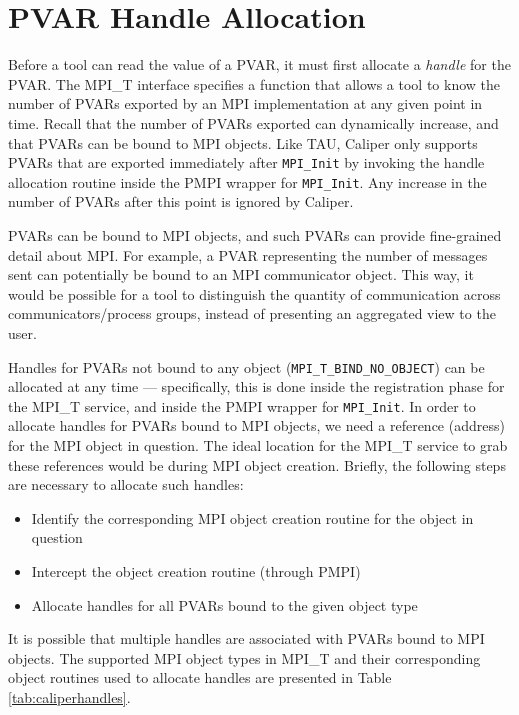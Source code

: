 \section{PVAR Handle Allocation}
Before a tool can read the value of a PVAR, it must first allocate a \emph{handle} for the PVAR. The MPI\_T interface specifies a function that allows a tool to know the number of PVARs exported by an MPI implementation at any given point in time. Recall that the number of PVARs exported can dynamically increase, and that PVARs can be bound to MPI objects. Like TAU, Caliper only supports PVARs that are exported immediately after \verb+MPI_Init+ by invoking the handle allocation routine inside the PMPI wrapper for \verb+MPI_Init+. Any increase in the number of PVARs after this point is ignored by Caliper. 
\par PVARs can be bound to MPI objects, and such PVARs can provide fine-grained detail about MPI. For example, a PVAR representing the number of messages sent can potentially be bound to an MPI communicator object. This way, it would be possible for a tool to distinguish the quantity of communication across communicators/process groups, instead of presenting an aggregated view to the user.
\par Handles for PVARs not bound to any object (\verb+MPI_T_BIND_NO_OBJECT+) can be allocated at any time --- specifically, this is done inside the registration phase for the MPI\_T service, and inside the PMPI wrapper for \verb+MPI_Init+. In order to allocate handles for PVARs bound to MPI objects, we need a reference (address) for the MPI object in question. The ideal location for the MPI\_T service to grab these references would be during MPI object creation. Briefly, the following steps are necessary to allocate such handles:
\begin{itemize}
\item Identify the corresponding MPI object creation routine for the object in question
\item Intercept the object creation routine (through PMPI)
\item Allocate handles for all PVARs bound to the given object type
\end{itemize}
It is possible that multiple handles are associated with PVARs bound to MPI objects. The supported MPI object types in MPI\_T and their corresponding object routines used to allocate handles are presented in Table \ref{tab:caliperhandles}.
